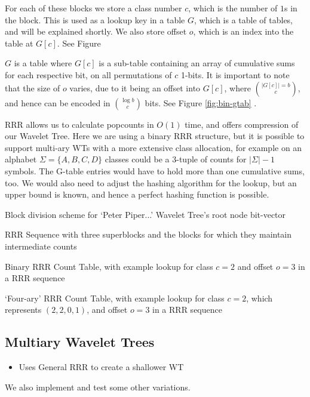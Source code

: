 For each of these blocks we store a class number $c$, which is the number of $1$s in the block. This is used as a lookup key in a table $G$, which is a table of tables, and will be explained shortly. We also store offset $o$, which is an index into the table at $G[c]$. See Figure%

$G$ is a table where $G[c]$ is a sub-table containing an array of cumulative sums for each respective bit, on all permutations of $c$ 1-bits. It is important to note that the size of $o$ varies, due to it being an offset into $G[c]$, where $|G[c]| = b \choose c$, and hence can be encoded in $\log b \choose c$ bits. See Figure \ref{fig:bin-gtab} .

RRR allows us to calculate popcounts in $O(1)$ time, and offers compression of our Wavelet Tree. Here we are using a binary RRR structure, but it is possible to support multi-ary WTs with a more extensive class allocation, for example on an alphabet $\Sigma = \{ A, B, C, D \}$ classes could be a 3-tuple of counts for $|\Sigma| - 1$ symbols. The G-table entries would have to hold more than one cumulative sums, too. We would also need to adjust the hashing algorithm for the lookup, but an upper bound is known, and hence a perfect hashing function is possible.

			{Block division scheme for `Peter Piper...' Wavelet Tree's root
			node bit-vector}

		{RRR Sequence with three superblocks and the blocks for which they
		maintain intermediate counts}

			{Binary RRR Count Table, with example lookup for class $c = 2$
			and offset $o = 3$ in a RRR sequence}

			{`Four-ary' RRR Count Table, with example lookup for class $c = 2$, 
			which represents $(2, 2, 0, 1)$, and offset $o = 3$ in a RRR
			sequence}
			
\subsection{Multiary Wavelet Trees}
\begin{itemize}
\item
  Uses General RRR to create a shallower WT
\end{itemize}
We also implement and test some other variations.

